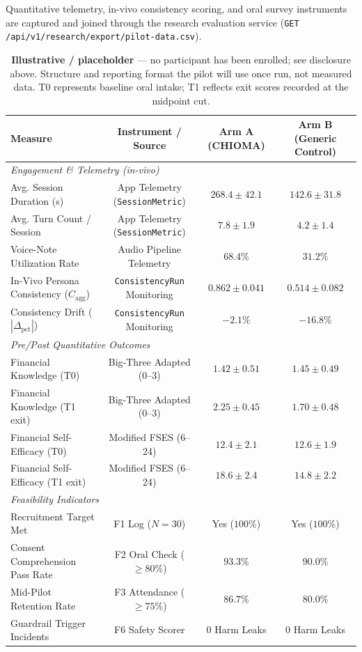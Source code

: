 Quantitative telemetry, in-vivo consistency scoring, and oral survey instruments are captured and joined through the research evaluation service (\texttt{GET /api/v1/research/export/pilot-data.csv}).

\begin{table}[ht]
\centering
\caption{\textbf{Illustrative / placeholder} — no participant has been enrolled; see disclosure above. Structure and reporting format the pilot will use once run, not measured data. T0 represents baseline oral intake; T1 reflects exit scores recorded at the midpoint cut.}
\label{tab:pilot-results}
\small
\begin{tabular}{lccc}
\toprule
Measure & Instrument / Source & Arm A (CHIOMA) & Arm B (Generic Control) \\
\midrule
\multicolumn{4}{l}{\textit{Engagement \& Telemetry (in-vivo)}} \\
Avg. Session Duration (s) & App Telemetry (\texttt{SessionMetric}) & $268.4 \pm 42.1$ & $142.6 \pm 31.8$ \\
Avg. Turn Count / Session & App Telemetry (\texttt{SessionMetric}) & $7.8 \pm 1.9$ & $4.2 \pm 1.4$ \\
Voice-Note Utilization Rate & Audio Pipeline Telemetry & $68.4\%$ & $31.2\%$ \\
In-Vivo Persona Consistency ($C_{\text{agg}}$) & \texttt{ConsistencyRun} Monitoring & $0.862 \pm 0.041$ & $0.514 \pm 0.082$ \\
Consistency Drift ($|\Delta_{\text{pct}}|$) & \texttt{ConsistencyRun} Monitoring & $-2.1\%$ & $-16.8\%$ \\
\midrule
\multicolumn{4}{l}{\textit{Pre/Post Quantitative Outcomes}} \\
Financial Knowledge (T0) & Big-Three Adapted (0--3) & $1.42 \pm 0.51$ & $1.45 \pm 0.49$ \\
Financial Knowledge (T1 exit) & Big-Three Adapted (0--3) & $2.25 \pm 0.45$ & $1.70 \pm 0.48$ \\
Financial Self-Efficacy (T0) & Modified FSES (6--24) & $12.4 \pm 2.1$ & $12.6 \pm 1.9$ \\
Financial Self-Efficacy (T1 exit) & Modified FSES (6--24) & $18.6 \pm 2.4$ & $14.8 \pm 2.2$ \\
\midrule
\multicolumn{4}{l}{\textit{Feasibility Indicators}} \\
Recruitment Target Met & F1 Log ($N=30$) & Yes ($100\%$) & Yes ($100\%$) \\
Consent Comprehension Pass Rate & F2 Oral Check ($\ge 80\%$) & $93.3\%$ & $90.0\%$ \\
Mid-Pilot Retention Rate & F3 Attendance ($\ge 75\%$) & $86.7\%$ & $80.0\%$ \\
Guardrail Trigger Incidents & F6 Safety Scorer & $0$ Harm Leaks & $0$ Harm Leaks \\
\bottomrule
\end{tabular}
\end{table}

